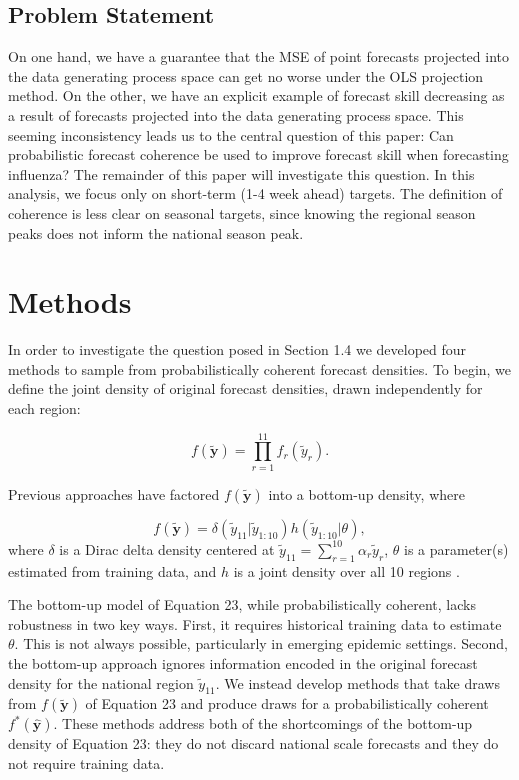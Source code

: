 \documentclass{umassthesis}          %
\begin{document}
\subsection{Problem Statement}
 
 On one hand, we have a guarantee that the MSE of point forecasts projected into the data generating process space can get no worse under the OLS projection method. On the other, we have an explicit example of forecast skill decreasing as a result of forecasts projected into the data generating process space. This seeming inconsistency leads us to the central question of this paper: Can probabilistic forecast coherence be used to improve forecast skill when forecasting influenza? The remainder of this paper will investigate this question. In this analysis, we focus only on short-term (1-4 week ahead) targets. The definition of coherence is less clear on seasonal targets, since knowing the regional season peaks does not inform the national season peak. 


\section{Methods}



In order to investigate the question posed in Section 1.4 we developed four methods to sample from probabilistically coherent forecast densities. To begin, we define the joint density of original forecast densities, drawn independently for each region:

\begin{equation}
f(\tilde{\bm{y}}) = \prod_{r=1}^{11} f_r(\tilde{y}_r).
\end{equation}

\noindent Previous approaches have factored $f(\tilde{\bm{y}})$ into a bottom-up density, where

\begin{equation}
f(\tilde{\bm{y}}) = \delta(\tilde{y}_{11} | \tilde{y}_{1:10})h(\tilde{y}_{1:10} | \theta),
\end{equation}
where $\delta$ is a Dirac delta density centered at  $\tilde{y}_{11} = \sum_{r=1}^{10} \alpha_r \tilde{y}_r$, $\theta$ is a parameter(s) estimated from training data, and $h$ is a joint density over all 10 regions \cite{taieb2017coherent}.



The bottom-up model of Equation 23, while probabilistically coherent, lacks robustness in two key ways. First, it requires historical training data to estimate $\theta$. This is not always possible, particularly in emerging epidemic settings. Second, the bottom-up approach ignores information encoded in the original forecast density for the national region $\tilde{y}_{11}$.  We instead develop methods that take draws from $f(\tilde{\bm{y}})$ of Equation 23 and produce draws for a probabilistically coherent $f^*(\hat{\bm{y}})$. These methods address both of the shortcomings of the bottom-up density of Equation 23: they do not discard national scale forecasts and they do not require training data.
\end{document}
